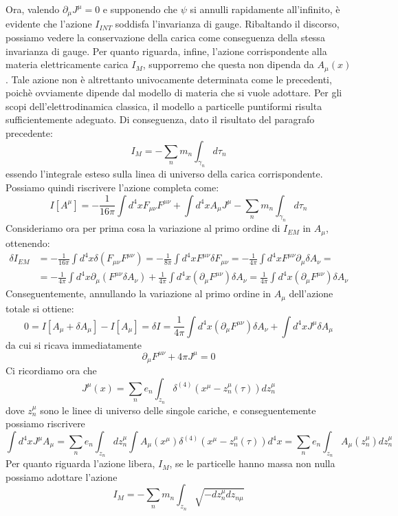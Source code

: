 \documentclass[a4paper,11pt]{book}
\theoremstyle{plain}
\theoremstyle{definition}
\begin{document}
Ora, valendo $\partial_{\mu}J^{\mu}=0$ e supponendo che $\psi$ si annulli rapidamente all'infinito, è evidente che l'azione $I_{INT}$ soddisfa l'invarianza di gauge. Ribaltando il discorso, possiamo vedere la conservazione della carica come conseguenza della stessa invarianza di gauge. Per quanto riguarda, infine, l'azione corrispondente alla materia elettricamente carica $I_M$, supporremo che questa non dipenda da $A_{\mu}(x)$. Tale azione non è altrettanto univocamente determinata come le precedenti, poichè ovviamente dipende dal modello di materia che si vuole adottare. Per gli scopi dell'elettrodinamica classica, il modello a particelle puntiformi risulta sufficientemente adeguato. Di conseguenza, dato il risultato del paragrafo precedente:
\[
I_M = -\sum_n m_n \int _{\gamma_n}d\tau_n
\] 
essendo l'integrale esteso sulla linea di universo della carica corrispondente. Possiamo quindi riscrivere l'azione completa come:
\[
I[A^{\mu}]=-\frac{1}{16\pi}\int d^4 xF_{\mu\nu}F^{\mu\nu}+\int d^4x A_{\mu}J^{\mu} -\sum_n m_n \int _{\gamma_n}d\tau_n
\]
Consideriamo ora per prima cosa la variazione al primo ordine di $I_{EM}$ in $A_{\mu}$, ottenendo:
\begin{align*}
\delta I_{EM} &= -\frac{1}{16\pi}\int d^4 x \delta(F_{\mu\nu}F^{\mu\nu}) = -\frac{1}{8\pi}\int d^4 x F^{\mu\nu}\delta F_{\mu\nu} = -\frac{1}{4\pi}\int d^4 x F^{\mu\nu}\partial_{\mu}\delta A_{\nu} = \\
&= -\frac{1}{4\pi}\int d^4 x\partial_{\mu}(F^{\mu\nu}\delta A_{\nu} ) + \frac{1}{4\pi}\int d^4x (\partial_{\mu}F^{\mu\nu})\delta A_{\nu} = \frac{1}{4\pi}\int d^4x (\partial_{\mu}F^{\mu\nu})\delta A_{\nu}
\end{align*}
Conseguentemente, annullando la variazione al primo ordine in $A_{\mu}$ dell'azione totale si ottiene:
\[
0 = I[A_{\mu}+\delta A_{\mu}] - I[A_{\mu}] = \delta I = \frac{1}{4\pi}\int d^4x (\partial_{\mu}F^{\mu\nu})\delta A_{\nu} + \int d^4 x J^{\mu}\delta A_{\mu}
\]
da cui si ricava immediatamente
\[
\partial_{\mu}F^{\mu\nu}+4\pi J^{\mu}=0
\]
Ci ricordiamo ora che 
\[
J^{\mu}(x) = \sum_n e_n \int _{z_n}\delta^{(4)}(x^{\mu}-z_n^{\mu}(\tau) ) dz_n^{\mu}
\]
dove $z_n^{\mu}$ sono le linee di universo delle singole cariche, e conseguentemente possiamo riscrivere
\[
\int d^4x J^{\mu} A_{\mu} = \sum_n e_n \int_{z_n} dz_n^{\mu} \int A_{\mu}(x^{\mu}) \delta^{(4)}(x^{\mu}-z_n^{\mu}(\tau) ) d^4x = \sum_n e_n \int_{z_n} A_{\mu}(z_n^{\mu})dz_n^{\mu}
\]
Per quanto riguarda l'azione libera, $I_M$, se le particelle hanno massa non nulla possiamo adottare l'azione
\[
I_M = -\sum_n m_n \int _{z_n} \sqrt{-dz_n^{\mu}dz_{n\mu}}
\]
\end{document}
